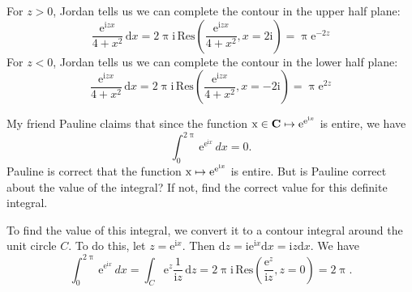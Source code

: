 \documentclass[fleqn,12pt]{exam}
\newcommand{\complex}{\mathbf{C}}
\newcommand{\imag}{\mathrm{i}}
\newcommand{\Res}{\mathrm{Res}}
\newcommand{\euler}{\mathrm{e}}
\begin{document}
\begin{questions}
 \begin{solution}[3.5in] For \(z > 0\),  Jordan tells us we can complete the contour  in the upper half plane:
 \[
  \frac{\euler^{\imag z x}}{4 + x^2} \, \mathrm{d} x = 2 \uppi \imag  \, \Res \left (\frac{\euler^{\imag z x}} {4 + x^2}, x = 2 \imag  \right) = \uppi \euler^{-2 z} 
 \]  
  For \(z < 0 \),  Jordan tells us we can complete the contour  in the lower half plane:
 \[
  \frac{\euler^{\imag z x}}{4 + x^2} \, \mathrm{d} x = 2 \uppi \imag  \, \Res \left (\frac{\euler^{\imag z x}} {4 + x^2}, x = -2 \imag  \right) =  \uppi \euler^{2 z} 
 \]  
\end{solution}



\question [10] My friend Pauline claims that since the function \(\mbox x \in \complex \mapsto \euler^{\euler^{\imag x}} \) is
entire, we have  
\[
  \int_0^{2 \uppi} \euler^{\euler^{\imag x}}  \, dx  = 0.
\]
Pauline  is correct that the function  \(\mbox x \mapsto \euler^{\euler^{\imag x}} \) is entire. But is Pauline  correct about the value of the integral? If not, find the correct value for this definite integral.
 \begin{solution}[3.5in]  To find the value of this integral, we convert it to a contour integral around the unit circle \(C\).  To do this, let \(z = \euler^{\imag x}\). Then \(\mathrm{d} z =
   \imag  \euler^{\imag x} \mathrm{d} x = \imag z \mathrm{d} x \).  We have
 \[
  \int_0^{2 \uppi} \euler^{\euler^{\imag x}}  \, dx = \int_C \euler^z \frac{1}{\imag z} \, \mathrm{d} z = 2 \uppi \imag \, \Res \left(\frac{\euler^z}{\imag z},z=0 \right) = 2 \uppi.
 \]
\end{solution}



\end{questions}
\end{document}
